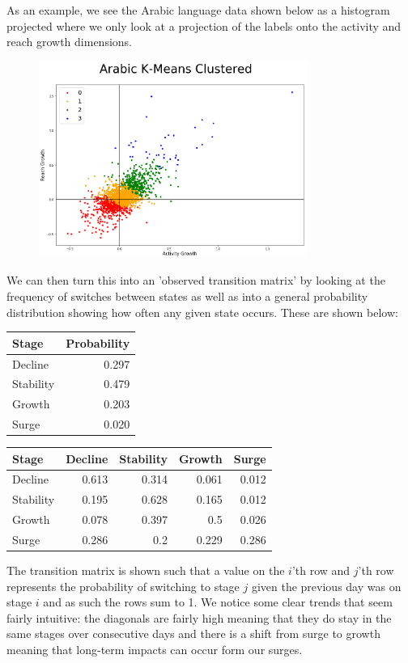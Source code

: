 \documentclass[12pt]{article}
\begin{document}
\FloatBarrier
As an example, we see the Arabic language data shown below as a histogram projected where we only look at a projection of the labels onto the activity and reach growth dimensions.
\FloatBarrier
\begin{figure}[hbtp]\centering
\includegraphics[width=0.78\textwidth,clip]{images/ArabicKMeans.png}
\end{figure}
\FloatBarrier
We can then turn this into an 'observed transition matrix' by looking at the frequency of switches between states as well as into a general probability distribution showing how often any given state occurs. These are shown below:
\begin{center}
\begin{tabular}{lr}
\toprule
Stage  & Probability \\
\midrule
Decline &  0.297 \\
Stability &  0.479 \\
Growth &  0.203 \\
Surge &  0.020 \\
\bottomrule
\end{tabular}
\quad
\begin{tabular}{lrrrr}
\toprule
Stage & Decline &  Stability & Growth & Surge \\
\midrule
Decline     &  0.613 &  0.314 &  0.061 &  0.012\\
Stability     &  0.195 &  0.628 &  0.165 &  0.012 \\
Growth     &  0.078 &  0.397 &  0.5 &  0.026 \\
Surge     &  0.286 &  0.2 &  0.229 &  0.286\\
\bottomrule
\end{tabular}
\end{center}
\vspace{0.5cm}
The transition matrix is shown such that a value on the $i$'th row and $j$'th row represents the probability of switching to stage $j$ given the previous day was on stage $i$ and as such the rows sum to 1. We notice some clear trends that seem fairly intuitive: the diagonals are fairly high meaning that they do stay in the same stages over consecutive days and there is a shift from surge to growth meaning that long-term impacts can occur form our surges.
\end{document}
